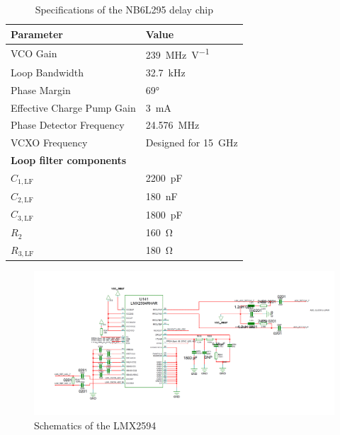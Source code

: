 \begin{table}[tbh]
	\caption[NB6L295 Characteristics]{Specifications of the NB6L295 delay chip \cite{NB6L295}}
	\label{tab:lmx2594_filter}
	\centering
	\begin{tabularx}{\textwidth}{Xl}
		\toprule
		\textbf{Parameter}                         & \textbf{Value}             \\ \bottomrule
		VCO Gain                                   & \SI{239}{\MHz\per\volt}    \\
		Loop Bandwidth                             & \SI{32.7}{\kHz}            \\
		Phase Margin                               & \ang{69}                   \\
		Effective Charge Pump Gain                 & \SI{3}{\milli\ampere}      \\
		Phase Detector Frequency                   & \SI{24.576}{\MHz}          \\
		VCXO Frequency                             & Designed for \SI{15}{\GHz} \\
		[0.3cm]
		 \textbf{Loop filter components} &                            \\
		$C_{1,\text{LF}}$                          & \SI{2200}{\pico\farad}     \\
		$C_{2,\text{LF}}$                          & \SI{180}{\nano\farad}      \\
		$C_{3,\text{LF}}$                          & \SI{1800}{\pico\farad}     \\
		$R_{2}$                                    & \SI{160}{\ohm}             \\
		$R_{3,\text{LF}}$                          & \SI{180}{\ohm}             \\ \bottomrule
	\end{tabularx}
\end{table}


\begin{figure}[tbh]
	\centering
	\includegraphics[width = \textwidth]{chap/04-work/img/lmx2594}
	\caption{Schematics of the LMX2594}
	\label{fig:lmx2594}
\end{figure}

